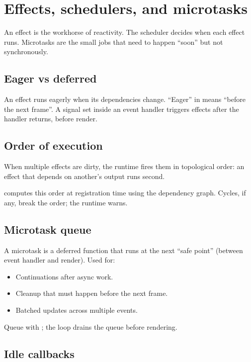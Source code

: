 \chapter{Effects, schedulers, and microtasks}
\label{ch:effects}

\begin{aside}
An effect is the workhorse of reactivity. The scheduler
decides when each effect runs. Microtasks are the small jobs
that need to happen ``soon'' but not synchronously.
\end{aside}

\section{Eager vs deferred}

An effect runs eagerly when its dependencies change. ``Eager''
in \maya{} means ``before the next frame''. A signal set
inside an event handler triggers effects after the handler
returns, before render.

\section{Order of execution}

When multiple effects are dirty, the runtime fires them in
topological order: an effect that depends on another's output
runs second.

\maya{} computes this order at registration time using the
dependency graph. Cycles, if any, break the order; the
runtime warns.

\section{Microtask queue}

A microtask is a deferred function that runs at the next
``safe point'' (between event handler and render). Used for:

\begin{itemize}[leftmargin=*]
  \item Continuations after async work.
  \item Cleanup that must happen before the next frame.
  \item Batched updates across multiple events.
\end{itemize}

Queue with ; the loop drains
the queue before rendering.

\section{Idle callbacks}

